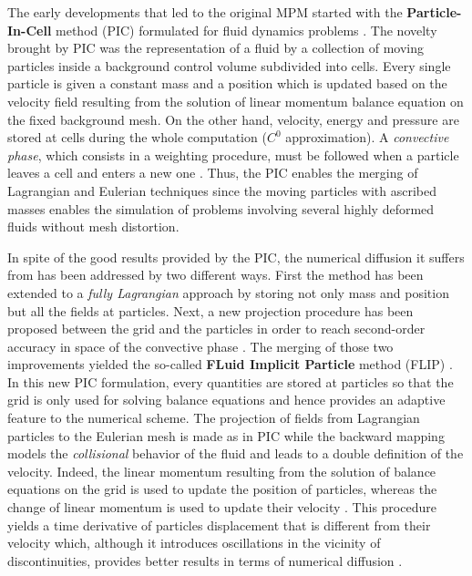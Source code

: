 The early developments that led to the original MPM started with the \textbf{Particle-In-Cell} method (PIC) formulated for fluid dynamics problems \cite{PIC}. The novelty brought by PIC was the representation of a fluid by a collection of moving particles inside a background control volume subdivided into cells. Every single particle is given a constant mass and a position which is updated based on the velocity field resulting from the solution of linear momentum balance equation on the fixed background mesh. On the other hand, velocity, energy and pressure are stored at cells during the whole computation ($C^0$ approximation). A \textit{convective phase}, which consists in a weighting procedure, must be followed when a particle leaves a cell and enters a new one \cite{PIC}. Thus, the PIC enables the merging of Lagrangian and Eulerian techniques since the moving particles with ascribed masses enables the simulation of problems involving several highly deformed fluids without mesh distortion.

In spite of the good results provided by the PIC, the numerical diffusion it suffers from has been addressed by two different ways. First the method has been extended to a \textit{fully Lagrangian} approach \cite{McCrory_FLIP} by storing not only mass and position but all the fields at particles. Next, a new projection procedure has been proposed between the grid and the particles in order to reach second-order accuracy in space of the convective phase \cite{PIC_Nishiguchi}. The merging of those two improvements yielded the so-called \textbf{FLuid Implicit Particle} method (FLIP) \cite{FLIP}. In this new PIC formulation, every quantities are stored at particles so that the grid is only used for solving balance equations and hence provides an adaptive feature to the numerical scheme. The projection of fields from Lagrangian particles to the Eulerian mesh is made as in PIC while the backward mapping models the \textit{collisional} behavior of the fluid and leads to a double definition of the velocity. Indeed, the linear momentum resulting from the solution of balance equations on the grid is used to update the position of particles, whereas the change of linear momentum is used to update their velocity \cite{Mass_Flip}. This procedure yields a time derivative of particles displacement that is different from their velocity which, although it introduces oscillations in the vicinity of discontinuities, provides better results in terms of numerical diffusion \cite{Mass_Flip}.

